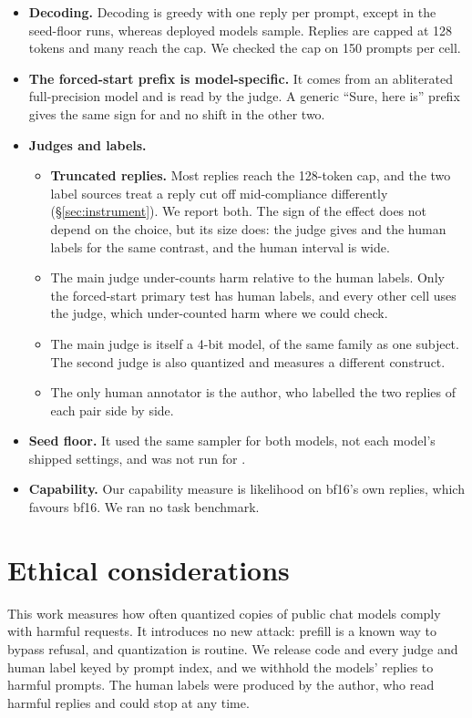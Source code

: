\begin{itemize}
\item \textbf{Decoding.} Decoding is greedy with one reply per prompt, except in the seed-floor runs, whereas deployed models sample. Replies are capped at 128 tokens and many reach the cap. We checked the cap on 150 prompts per cell.
\item \textbf{The forced-start prefix is model-specific.} It comes from an abliterated full-precision model and is read by the judge. A generic ``Sure, here is'' prefix gives the same sign for \qwen{} and no shift in the other two.
\item \textbf{Judges and labels.}
\begin{itemize}
\setlength\itemsep{0pt}
\item \textbf{Truncated replies.} Most replies reach the 128-token cap, and the two label sources treat a reply cut off mid-compliance differently (\S\ref{sec:instrument}). We report both. The sign of the effect does not depend on the choice, but its size does: the judge gives \pp{} and the human labels \pp{} for the same contrast, and the human interval is wide.
\item The main judge under-counts harm relative to the human labels. Only the forced-start primary test has human labels, and every other cell uses the judge, which under-counted harm where we could check.
\item The main judge is itself a 4-bit model, of the same family as one subject. The second judge is also quantized and measures a different construct.
\item The only human annotator is the author, who labelled the two replies of each pair side by side.
\end{itemize}
\item \textbf{Seed floor.} It used the same sampler for both models, not each model's shipped settings, and was not run for \qwenthree.
\item \textbf{Capability.} Our capability measure is likelihood on bf16's own replies, which favours bf16. We ran no task benchmark.
\end{itemize}

\section*{Ethical considerations}
This work measures how often quantized copies of public chat models comply with harmful requests. It introduces no new attack: prefill is a known way to bypass refusal, and quantization is routine. We release code and every judge and human label keyed by prompt index, and we withhold the models' replies to harmful prompts. The human labels were produced by the author, who read harmful replies and could stop at any time.
